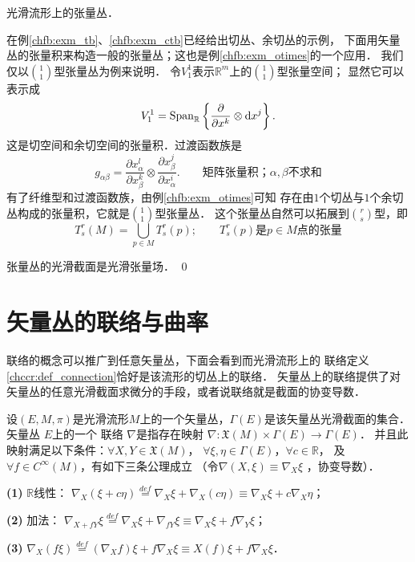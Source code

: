 \begin{example}\label{chfb:exm_tensor-bundles}
    光滑流形上的张量丛．
\end{example}
在例\ref{chfb:exm_tb}、\ref{chfb:exm_ctb}已经给出切丛、余切丛的示例，
下面用矢量丛的张量积来构造一般的张量丛；这也是例\ref{chfb:exm_otimes}的一个应用．
我们仅以$\binom{1}{1}$型张量丛为例来说明．
令$V^1_1$表示$\mathbb{R}^m$上的$\binom{1}{1}$型张量空间；
显然它可以表示成
\begin{equation*}
    V^1_1 = {\rm Span}_{\mathbb{R}}\left\{  \frac{\partial}{\partial x^k}\otimes {\rm d}x^j \right\} .
\end{equation*}
这是切空间和余切空间的张量积．过渡函数族是
\begin{equation*}
    g_{\alpha\beta} = \frac{\partial {x}^l_\alpha}{\partial {x}^k_\beta} \otimes
    \frac{\partial {x}^j_\beta}{\partial {x}^i_\alpha}  .
    \qquad \text{矩阵张量积；}\alpha,\beta \text{不求和}
\end{equation*}
有了纤维型和过渡函数族，由例\ref{chfb:exm_otimes}可知
存在由$1$个切丛与$1$个余切丛构成的张量积，它就是$\binom{1}{1}$型张量丛．
这个张量丛自然可以拓展到$\binom{r}{s}$型，即
\begin{equation*}
    T_s^r(M)=\bigcup_{p \in M} T_s^r(p); \qquad
    T_s^r(p)\text{是}p\in M\text{点的张量}
\end{equation*}


张量丛的光滑截面是光滑张量场．
\qed








\section{矢量丛的联络与曲率}\label{chfb:sec_connection}

联络的概念可以推广到任意矢量丛，下面会看到而光滑流形上的
联络定义\ref{chccr:def_connection}恰好是该流形的切丛上的联络．
矢量丛上的联络提供了对矢量丛的任意光滑截面求微分的手段，或者说联络就是截面的协变导数．


\begin{definition}\label{chfb:def_vb-conncection}
    设$(E,M,\pi)$是光滑流形$M$上的一个矢量丛，$\Gamma(E)$是该矢量丛光滑截面的集合．
    矢量丛 $E$上的一个 {\heiti 联络} $\nabla$是指存在映射
    $\nabla: \mathfrak{X}(M) \times \Gamma(E) \rightarrow \Gamma(E)$．
    并且此映射满足以下条件：$\forall X, Y \in \mathfrak{X}(M)$，
    $\forall \xi, \eta \in \Gamma(E)$，$\forall c \in \mathbb{R}$，
    及 $\forall f \in C^{\infty}(M)$，有如下三条公理成立
    （令$\nabla(X, \xi)\equiv \nabla_X \xi$ ，{\heiti 协变导数}）．
    
    {\bfseries (1)} $\mathbb{R}$线性： $\nabla_X(\xi+c \eta) \overset{def}{=}
     \nabla_X \xi+\nabla_X (c\eta) \equiv  \nabla_X \xi+c \nabla_X \eta$；
    
    {\bfseries (2)} 加法： $\nabla_{X+f Y} \xi \overset{def}{=} 
    \nabla_X \xi+ \nabla_{fY} \xi \equiv \nabla_X \xi+f \nabla_Y \xi$；
    
    {\bfseries (3)} $\nabla_X(f \xi) \overset{def}{=} (\nabla_X f) \xi+f \nabla_X \xi
     \equiv X(f) \xi+f \nabla_X \xi$．
\end{definition}



